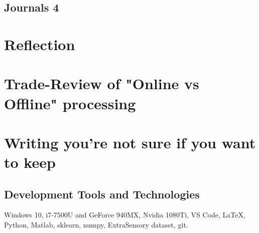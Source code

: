 \documentclass{UoNMCHA}
\numberwithin{equation}{section}
\begin{document}
\subsection{Journals 4}
\section{Reflection}
\section{Trade-Review of "Online vs Offline" processing}\label{sec:TradeReview}



\section{Writing you're not sure if you want to keep}
\subsection{Development Tools and Technologies}
Windows 10, i7-7500U and GeForce 940MX, Nvidia 1080Ti, VS Code, LaTeX, Python, Matlab, sklearn, numpy, ExtraSensory dataset, git.
\end{document}

